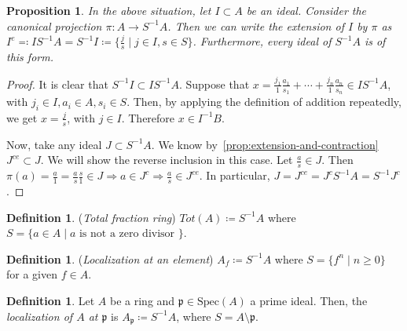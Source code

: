 \documentclass[11pt]{article}
\newtheorem{prop}[theorem]{Proposition}
\theoremstyle{definition}
\newtheorem{defn}[theorem]{Definition}
\begin{document}
        \begin{prop} \label{prop:extension-in-fractions}
            In the above situation, let $I \subset A$ be an ideal.
            Consider the canonical projection $\pi: A \rightarrow S^{-1}A$.
            Then we can write the extension of $I$ by $\pi$ as
            $I^{e} \eqqcolon IS^{-1}A = S^{-1}I \coloneqq \{\frac{j}{s} \mid j \in I, s \in S \}$.
            Furthermore, every ideal of $S^{-1}A$ is of this form.
        \end{prop}
            \begin{proof}
                    It is clear that $S^{-1}I \subset IS^{-1}A$.
                    Suppose that $x = \frac{j_1}{1} \frac{a_1}{s_1} + \cdots + \frac{j_n}{1} \frac{a_n}{s_n} \in IS^{-1}A$,
                    with $j_i \in I, a_i \in A, s_i \in S$.
                    Then, by applying the definition of addition repeatedly, we get
                    $x = \frac{j}{s}$, with $j \in I$.
                    Therefore $x \in I^{-1}B$.

                    \noindent Now, take any ideal $J \subset S^{-1}A$.
                    We know by~\ref{prop:extension-and-contraction} $J^{ce} \subset J$.
                    We will show the reverse inclusion in this case.
                    Let $\frac{a}{s} \in J.$ Then $\pi(a) = \frac{a}{1} = \frac{a}{s} \frac{s}{1} \in J \Rightarrow a \in J^c \Rightarrow \frac{a}{s} \in J^{ce} $.
                    In particular, $J = J^{ce} = J^{c}S^{-1}A = S^{-1}J^{c}$.
                    \end{proof}

        \begin{defn}
            (\emph{Total fraction ring}) $Tot(A) \coloneqq S^{-1}A$ where $S = \{a \in A \mid a \text{ is not a zero divisor }\}$.
        \end{defn}

        \begin{defn}
            (\emph{Localization at an element}) $A_f \coloneqq S^{-1}A$ where $S = \{f^n \mid n \geq 0\}$ for a given $f \in A$.
        \end{defn}

        \begin{defn}
            Let $A$ be a ring and $\mathfrak{p} \in \text{Spec}(A)$ a prime ideal.
            Then, the \emph{localization of $A$ at $\mathfrak{p}$} is $A_{\mathfrak{p}} \coloneqq S^{-1}A$, where $S = A \setminus \mathfrak{p}$.
        \end{defn}
\end{document}
